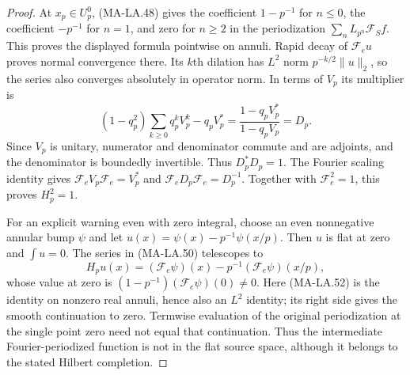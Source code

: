 \begin{proof}
At $x_p\in U_p^0$, (MA-LA.48) gives the coefficient
$1-p^{-1}$ for $n\le0$, the coefficient $-p^{-1}$ for
$n=1$, and zero for $n\ge2$ in the periodization
$\sum_nL_{p^n}\mathcal F_S f$.  This proves the displayed
formula pointwise on annuli.  Rapid decay of $\mathcal F_eu$
proves normal convergence there.  Its $k$th dilation has
$L^2$ norm $p^{-k/2}\|u\|_2$, so the series also converges
absolutely in operator norm.
In terms of $V_p$ its multiplier is
\[
 (1-q_p^2)\sum_{k\ge0}q_p^kV_p^k-q_pV_p^*
       =\frac{1-q_pV_p^*}{1-q_pV_p}=D_p.
 \tag{MA-LA.51}
\]
Since $V_p$ is unitary, numerator and denominator commute
and are adjoints, and the denominator is boundedly invertible.
Thus $D_p^*D_p=1$.
The Fourier scaling identity gives
$\mathcal F_e V_p\mathcal F_e=V_p^*$ and
$\mathcal F_e D_p\mathcal F_e=D_p^{-1}$.
Together with $\mathcal F_e^2=1$, this proves $H_p^2=1$.

For an explicit warning even with zero integral, choose an
even nonnegative annular bump $\psi$ and let
$u(x)=\psi(x)-p^{-1}\psi(x/p)$.
Then $u$ is flat at zero and $\int u=0$.
The series in (MA-LA.50) telescopes to
\[
                H_pu(x)=(\mathcal F_e\psi)(x)
                                -p^{-1}(\mathcal F_e\psi)(x/p),
 \tag{MA-LA.52}
\]
whose value at zero is
$(1-p^{-1})(\mathcal F_e\psi)(0)\ne0$.
Here (MA-LA.52) is the identity on nonzero real annuli,
hence also an $L^2$ identity; its right side gives the
smooth continuation to zero.  Termwise evaluation of
the original periodization at the single point zero
need not equal that continuation.
Thus the intermediate Fourier-periodized function is not
in the flat source space, although it belongs to the stated
Hilbert completion.
\end{proof}

